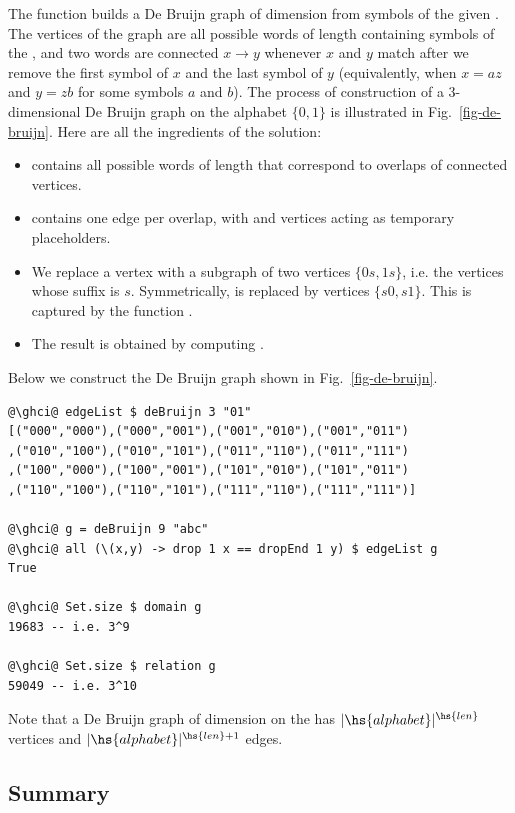 The function builds a De Bruijn graph of dimension  from symbols of the given
. The vertices of the graph are all possible words of length 
containing symbols of the , and two words are connected $x \rightarrow y$
whenever $x$ and $y$ match after we remove the first symbol of $x$ and the last symbol
of $y$ (equivalently, when $x = az$ and $y = zb$ for some symbols $a$ and $b$).
The process of construction of a 3-dimensional De Bruijn graph on the alphabet
$\{0, 1\}$ is illustrated in Fig.~\ref{fig-de-bruijn}. Here are all the ingredients
of the solution:
\begin{itemize}
    \item {} contains all possible words of length  that
    correspond to overlaps of connected vertices.
    \item {} contains one edge per overlap, with  and
     vertices acting as temporary placeholders.
    \item We replace a vertex  with a subgraph of two vertices
    $\{0s, 1s\}$, i.e. the vertices whose suffix is $s$. Symmetrically,
     is replaced by vertices $\{s0, s1\}$. This is captured
    by the function .
    \item The result is obtained by computing   .
\end{itemize}

Below we construct the De Bruijn graph shown in Fig.~\ref{fig-de-bruijn}.
\begin{verbatim}
@\ghci@ edgeList $ deBruijn 3 "01"
[("000","000"),("000","001"),("001","010"),("001","011")
,("010","100"),("010","101"),("011","110"),("011","111")
,("100","000"),("100","001"),("101","010"),("101","011")
,("110","100"),("110","101"),("111","110"),("111","111")]

@\ghci@ g = deBruijn 9 "abc"
@\ghci@ all (\(x,y) -> drop 1 x == dropEnd 1 y) $ edgeList g
True

@\ghci@ Set.size $ domain g
19683 -- i.e. 3^9

@\ghci@ Set.size $ relation g
59049 -- i.e. 3^10
\end{verbatim}

\noindent
Note that a De Bruijn graph of dimension  on the  has
$|\hs{alphabet}|^{\hs{len}}$ vertices and $|\hs{alphabet}|^{\hs{len} + 1}$
edges.

\subsection{Summary}\label{sub-library-summary}

